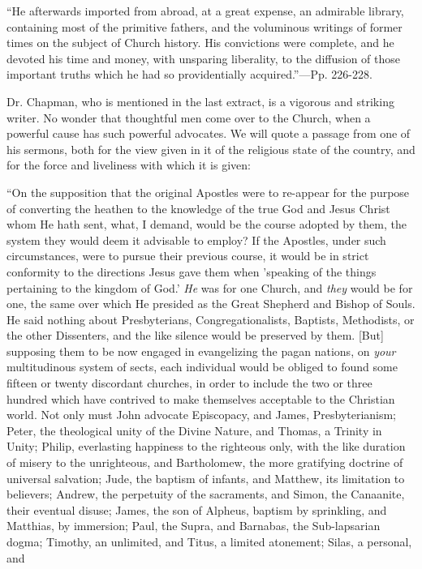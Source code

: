 ``He
afterwards imported from abroad, at a great expense, an admirable
library, containing most of the primitive fathers, and the voluminous
writings of former times on the subject of Church history. His
convictions were complete, and he devoted his time and money, with
unsparing liberality, to the diffusion of those important truths which
he had so providentially acquired.''—Pp. 226-228.

Dr. Chapman, who is mentioned in the last
extract, is a vigorous and striking writer. No wonder that thoughtful
men come over to the Church, when a powerful cause has such powerful
advocates. We will quote a passage from one of his sermons, both for
the view given in it of the religious state of the country, and for
the force and liveliness with which it is given:

``On
the supposition that the original Apostles were to re-appear for the
purpose of converting the heathen to the knowledge of the true God and
Jesus Christ whom He hath sent, what, I demand, would be the course
adopted by them, the system they would deem it advisable to employ? If
the Apostles, under such circumstances, were to pursue their previous
course, it would be in strict conformity to the directions Jesus gave
them when 'speaking of the things pertaining to the kingdom of God.' \emph{He} was for one Church, and \emph{they}
would be for one, the same over which He presided as the Great
Shepherd and Bishop of Souls. He said nothing about Presbyterians,
Congregationalists, Baptists, Methodists, or the other Dissenters, and
the like silence would be preserved by them. [But] supposing them to
be now engaged in evangelizing the pagan nations, on \emph{your}
multitudinous system of sects, each individual would be obliged to
found some fifteen or twenty discordant churches, in order to include
the two or three hundred which have contrived to make themselves
acceptable to the Christian world. Not only must John advocate
Episcopacy, and James, Presbyterianism; Peter, the theological unity
of the Divine Nature, and Thomas, a Trinity in Unity; Philip,
everlasting happiness to the righteous only, with the like duration of
misery to the unrighteous, and Bartholomew, the more gratifying
doctrine of universal salvation; Jude, the baptism of infants, and
Matthew, its limitation to believers; Andrew, the perpetuity of the
sacraments, and Simon, the Canaanite, their eventual disuse; James,
the son of Alpheus, baptism by sprinkling, and Matthias, by immersion;
Paul, the Supra, and Barnabas, the Sub-lapsarian dogma; Timothy, an
unlimited, and Titus, a limited atonement; Silas, a personal, and
